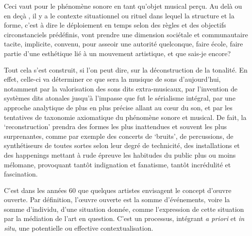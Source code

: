 \documentclass{article}
\begin{document}
 Ceci vaut pour le phénomène sonore en tant qu'objet musical perçu. Au delà ou en deçà , il y a  le contexte situationnel ou rituel dans lequel la structure et la forme, c'est à dire le déploiement en temps selon des règles et des objectifs circonstanciels prédéfinis, vont prendre une dimension sociétale et communautaire %
tacite, implicite, convenu, pour asseoir une autorité quelconque, faire école, faire partie d'une esthétique lié à un mouvement artistique, et que sais-je encore?  


Tout cela s'est construit, si l'on peut dire, sur la déconstruction de la tonalité. En effet, celle-ci va déterminer ce que sera la musique de sons d'aujourd'hui, notamment  par la valorisation des sons dits extra-musicaux, par l'invention de systèmes dits atonales jusqu'à l'impasse que fut le sérialisme intégral, par une approche analytique de plus en plus précise allant au cœur du son, et par les tentatives de taxonomie axiomatique du phénomène sonore et musical. De fait, la `reconstruction' prendra des formes les plus inattendues et souvent les plus surprenantes, comme par exemple des concerts de `bruits', de percussions, de synthétiseurs de toutes sortes selon leur degré de technicité, des installations et des happenings mettant à rude épreuve les habitudes du public plus ou moins mélomane, provoquant tantôt indignation et fanatisme, tantôt incrédulité et fascination. %


\bigskip

C'est dans les années 60 que quelques artistes envisagent le concept d'œuvre ouverte. Par définition, l'œuvre ouverte est la somme d'événements, voire la somme d'individu, d'une situation donnée, comme l'expression de cette situation par la médiation de l'art en question. C'est un processus, intégrant \textit{a priori} et \textit{in situ}, une potentielle ou effective contextualisation.
\end{document}
